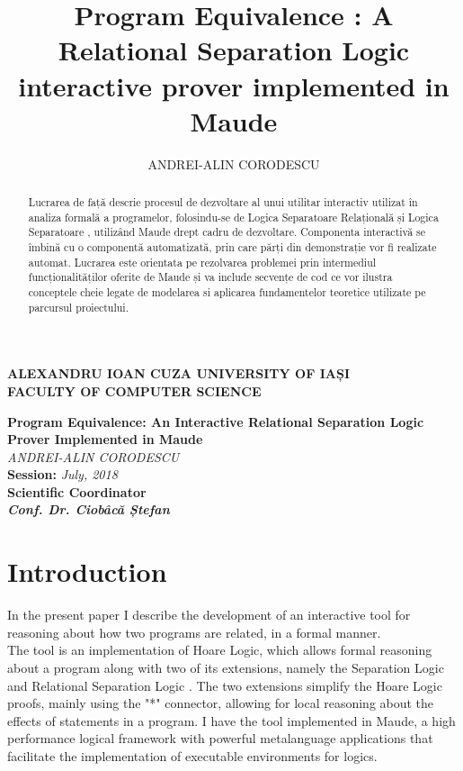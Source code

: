 \documentclass[12pt,a4paper]{article}
\author{ANDREI-ALIN CORODESCU}
\title{Program Equivalence : A Relational Separation Logic interactive prover implemented in Maude}
\newcommand\blankpage{%
	\null
	\thispagestyle{empty}%
	\addtocounter{page}{-1}%
	\newpage}
\begin{document}
\begin{titlepage}
\begin{center}
\afterpage{\blankpage}
\textbf{
ALEXANDRU IOAN CUZA UNIVERSITY OF IAȘI
}
\\
\textbf{FACULTY OF COMPUTER SCIENCE}
\end{center}
   \vspace{40mm}
\begin{center}
	\Large\textbf {Program Equivalence: An Interactive Relational Separation Logic Prover Implemented in Maude}\\
	\vspace{40mm}
	\large\textit {ANDREI-ALIN CORODESCU}
	\\
	\vspace{20mm}
	\textbf{Session: }\textit{July, 2018}\\
	\vspace{30mm}
	\textbf{Scientific Coordinator}\\
	\textbf{\textit{Conf. Dr. Ciobâcă Ștefan}}
	\vspace{30mm}
\end{center}
\end{titlepage}

\tableofcontents
\pagebreak
\begin{abstract}
	Lucrarea de față descrie procesul de dezvoltare al unui utilitar interactiv utilizat în analiza formală a programelor, folosindu-se de Logica Separatoare Relațională \cite{relational} și Logica Separatoare \cite{primer} \cite{SeparationLogic}, utilizând Maude \cite{maudesite} drept cadru de dezvoltare. Componenta interactivă se îmbină cu o componentă automatizată, prin care părți din demonstrație vor fi realizate automat. Lucrarea este orientata pe rezolvarea problemei prin intermediul funcționalităților oferite de Maude și va include secvențe de cod ce vor ilustra conceptele cheie legate de modelarea si aplicarea fundamentelor teoretice utilizate pe parcursul proiectului.
\end{abstract}
\section*{Introduction}
In the present paper I describe the development of an interactive tool for reasoning about how two programs are related, in a formal manner. \\


The tool is an implementation of Hoare Logic, which allows formal reasoning about a program along with two of its extensions, namely the Separation Logic and Relational Separation Logic \cite{relational}. The two extensions simplify the Hoare Logic proofs, mainly using the "*" connector, allowing for local reasoning about the effects of statements in a program. I have the tool implemented in Maude, a high performance logical framework with powerful metalanguage applications that facilitate the implementation of executable environments for logics.\\
\end{document}
